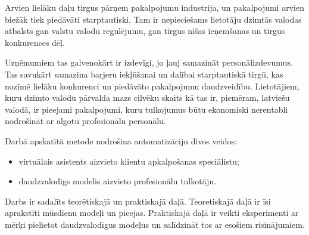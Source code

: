 Arvien lielāku daļu tirgus pārņem pakalpojumu industrija,
un pakalpojumi arvien biežāk tiek piedāvāti starptautiski. Tam ir nepieciešams lietotāju dzimtās valodas atbalsts gan valstu valodu regulējumu, gan tirgus nišas ieņemšanas un tirgus konkurences dēļ.

Uzņēmumiem tas galvenokārt ir izdevīgi, jo ļauj samazināt personālizdevumus.
Tas savukārt samazina barjeru iekļūšanai un dalībai starptautiskā tirgū, kas nozīmē lielāku konkurenci un piedāvāto pakalpojumu daudzveidību. Lietotājiem, kuru dzimto valodu pārvalda mazs cilvēku skaits kā tas ir, piemēram, latviešu valodā, ir pieejami pakalpojumi, kuru tulkojumus būtu ekonomiski nerentabli nodrošināt ar algotu profesionālu personālu.

Darbā apskatītā metode nodrošina automatizāciju divos veidos: 
\begin{itemize}
	\item virtuālais asistents aizvieto klientu apkalpošanas speciālistu;
	\item daudzvalodīgs modelis aizvieto profesionālu tulkotāju.
\end{itemize}

Darbs ir sadalīts teorētiskajā un praktiskajā daļā. Teoretiskajā daļā ir īsi aprakstīti mūsdienu modeļi un pieejas. Praktiskajā daļā ir veikti eksperimenti ar mērķi pielietot daudzvalodīgus modeļus un salīdzināt tos ar esošiem risinājumiem. 